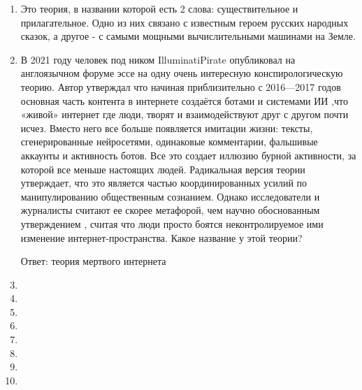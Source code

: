 \documentclass[oneside,final,14pt]{extreport}
\begin{document}
\begin{enumerate}
    Ответ: рисунок с презы

    Комментарий: Раньше применялось название "мо" (англ. mho), представляющее собой прочитанное назад слово "ом" (ohm); обозначалось перевернутой буквой $\Omega$

    \item Это теория, в названии которой есть 2 слова: существительное и прилагательное. Одно из них связано с известным героем русских народных сказок, а другое - с самыми мощными вычислительными машинами на Земле.

    \item В 2021 году человек под ником IlluminatiPirate опубликовал на англоязычном форуме эссе на одну очень интересную конспирологическую теорию. Автор утверждал что начиная приблизительно с 2016—2017 годов основная часть контента в интернете создаётся ботами и системами ИИ ,что «живой» интернет где люди, творят и взаимодействуют друг с другом почти исчез. Вместо него все больше появляется имитации жизни: тексты, сгенерированные нейросетями, одинаковые комментарии, фальшивые аккаунты и активность ботов. Все это создает иллюзию бурной активности, за которой все меньше настоящих людей. Радикальная версия теории утверждает, что это является частью координированных усилий по манипулированию общественным сознанием. Однако исследователи и журналисты считают ее скорее метафорой, чем научно обоснованным утверждением , считая что люди просто боятся неконтролируемое ими изменение интернет-пространства.  Какое название у этой теории?

    Ответ: теория мертвого интернета
    \item
    \item
    \item
    \item
    \item
    \item
    \item
    \item
\end{enumerate}
\end{document}
